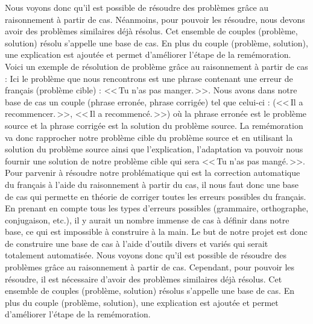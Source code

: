 \documentclass[11pt]{article}
\begin{document}
Nous voyons donc qu'il est possible de r\'{e}soudre des probl\`{e}mes gr\^ace au raisonnement \`{a} partir de cas. N\'{e}anmoins, pour pouvoir les r\'{e}soudre, nous devons avoir des probl\`{e}mes similaires d\'{e}j\`{a} r\'{e}solus. Cet ensemble de couples (probl\`{e}me, solution) r\'{e}solu s'appelle une base de cas. En plus du couple (probl\`{e}me, solution), une explication est ajout\'{e}e et permet d'am\'{e}liorer l'\'{e}tape de la rem\'{e}moration.
\newline
\newline
Voici un exemple de r\'{e}solution de probl\`{e}me gr\^ace au raisonnement \`{a} partir de cas : 
Ici le probl\`{e}me que nous rencontrons est une phrase contenant une erreur de fran\c{c}ais (probl\`{e}me cible) : <<\,Tu n'as pas manger.\,>>.
Nous avons dans notre base de cas un couple (phrase erron\'{e}e, phrase corrig\'{e}e) tel que celui-ci : (<<\,Il a recommencer.\,>>, <<\,Il a recommenc\'{e}.\,>>) o\`{u} la phrase erron\'{e}e est le probl\`{e}me source et la phrase corrig\'{e}e est la solution du probl\`{e}me source.
La rem\'{e}moration va donc rapprocher notre probl\`{e}me cible du probl\`{e}me source et en utilisant la solution du probl\`{e}me source ainsi que l'explication, l'adaptation va pouvoir nous fournir une solution de notre probl\`{e}me cible qui sera <<\,Tu n'as pas mang\'{e}.\,>>.
\newline
\newline
Pour parvenir \`{a} r\'{e}soudre notre probl\'{e}matique qui est la correction automatique du fran\c{c}ais \`{a} l'aide du raisonnement \`{a} partir du cas, il nous faut donc une base de cas qui permette en th\'{e}orie de corriger toutes les erreurs possibles du fran\c{c}ais. En prenant en compte tous les types d'erreurs possibles (grammaire, orthographe, conjugaison, etc.), il y aurait un nombre immense de cas \`{a} d\'{e}finir dans notre base, ce qui est impossible \`{a} construire \`{a} la main. Le but de notre projet est donc de construire une base de cas \`{a} l'aide d'outils divers et vari\'{e}s qui serait totalement automatis\'{e}e.
\newline
\newline
Nous voyons donc qu'il est possible de r\'{e}soudre des probl\`{e}mes gr\^{a}ce au raisonnement \`{a} partir de cas. Cependant, pour pouvoir les r\'{e}soudre, il est n\'{e}cessaire d'avoir des probl\`{e}mes similaires d\'{e}j\`{a} r\'{e}solus. Cet ensemble de couples (probl\`{e}me, solution) r\'{e}solus s'appelle une base de cas. En plus du couple (probl\`{e}me, solution), une explication est ajout\'{e}e et permet d'am\'{e}liorer l'\'{e}tape de la rem\'{e}moration.
\newline
\newline
\end{document}
